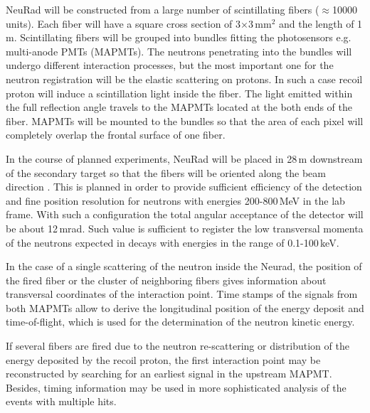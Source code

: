 \documentclass{webofc}
\begin{document}
NeuRad will be constructed from a large number of scintillating fibers ($\approx$10000 units). Each fiber will have a square cross section of 3$\times$3\,mm$^2$ and the length of 1\,m. Scintillating fibers will be grouped into bundles fitting the photosensors e.g. multi-anode PMTs (MAPMTs).
The neutrons penetrating into the bundles will undergo different interaction processes, but the most important one for the neutron registration will be the elastic scattering on protons. In such a case recoil proton will induce a scintillation light inside the fiber. 
The light emitted within the full reflection angle travels to the MAPMTs located at the both ends of the fiber.
MAPMTs will be mounted to the bundles so that the area of each pixel will completely overlap the frontal surface of one fiber.


In the course of planned experiments, NeuRad will be placed in 28\,m downstream of the secondary target so that the fibers will be oriented along the beam direction \cite{report}.
This is planned in order to provide sufficient efficiency of the detection and fine position resolution for neutrons with energies 200-800\,MeV in the lab frame.
With such a configuration the total angular acceptance of the detector will be about 12\,mrad.
Such value is sufficient to register the low transversal momenta of the neutrons expected in decays with energies in the range of 0.1-100\,keV.

In the case of a single scattering of the neutron inside the Neurad, the position of the fired fiber or the cluster of neighboring fibers gives information about transversal coordinates of the interaction point. Time stamps of the signals from both MAPMTs allow to derive the longitudinal position of the energy deposit and time-of-flight, which is used for the determination of the neutron kinetic energy. 

If several  fibers are fired due to the neutron re-scattering or distribution of the energy deposited by the recoil proton, the first interaction point may be reconstructed by searching for an earliest signal in the upstream MAPMT. Besides, timing information may be used in more sophisticated analysis of the events with multiple hits.
\end{document}
